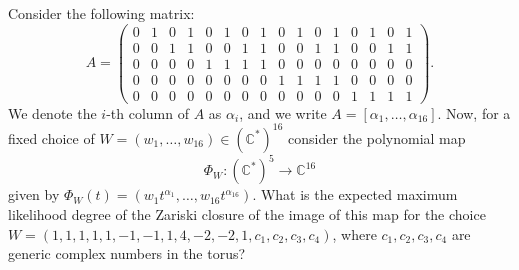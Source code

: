 Consider the following matrix:
\[
A =\left(\!\begin{array}{cccccccccccccccc}
     0&1&0&1&0&1&0&1&0&1&0&1&0&1&0&1\\
     0&0&1&1&0&0&1&1&0&0&1&1&0&0&1&1\\
     0&0&0&0&1&1&1&1&0&0&0&0&0&0&0&0\\
     0&0&0&0&0&0&0&0&1&1&1&1&0&0&0&0\\
     0&0&0&0&0&0&0&0&0&0&0&0&1&1&1&1
\end{array}\!\right).
\]
We denote the $i$-th column of $A$ as $\alpha_i$, and we write $A = [\alpha_1,\dots,\alpha_{16}]$. Now, for a fixed choice of $W = (w_1,\dots,w_{16}) \in (\mathbb{C}^*)^{16}$ consider the polynomial map
\[
\Phi_W\colon(\mathbb{C}^*)^{5} \longrightarrow \mathbb{C}^{16}
\]
given by $\Phi_{W}(t) = (w_1 t^{\alpha_1},\dots,w_{16} t^{\alpha_{16}})$. What is the expected maximum likelihood degree of the Zariski closure of the image of this map for the choice $W = (1,1,1,1,1,-1,-1,1,4,-2,-2,1,c_1,c_2,c_3,c_4)$, where $c_1,c_2,c_3,c_4$ are generic complex numbers in the torus?
